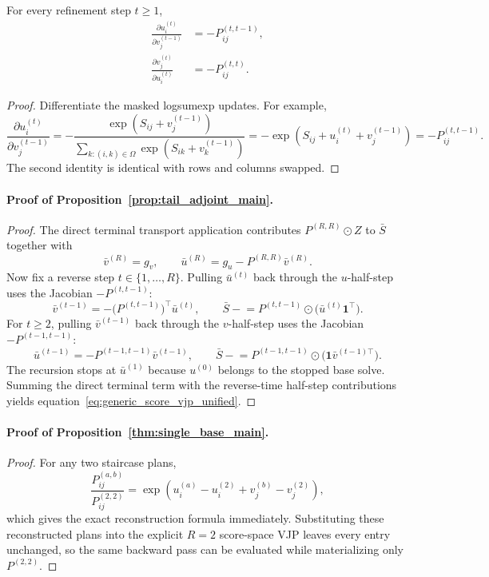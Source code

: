 \begin{lemma}
For every refinement step $t\ge 1$,
\begin{align}
    \frac{\partial u_i^{(t)}}{\partial v_j^{(t-1)}} &= -P_{ij}^{(t,t-1)}, \\
    \frac{\partial v_j^{(t)}}{\partial u_i^{(t)}} &= -P_{ij}^{(t,t)}.
\end{align}
\end{lemma}

\begin{proof}
Differentiate the masked logsumexp updates. For example,
\[
\frac{\partial u_i^{(t)}}{\partial v_j^{(t-1)}}
=
-
\frac{\exp(S_{ij}+v_j^{(t-1)})}{\sum_{k:(i,k)\in\Omega}\exp(S_{ik}+v_k^{(t-1)})}
=
-\exp(S_{ij}+u_i^{(t)}+v_j^{(t-1)})
=
-P_{ij}^{(t,t-1)}.
\]
The second identity is identical with rows and columns swapped.
\end{proof}

\paragraph{Proof of Proposition~\ref{prop:tail_adjoint_main}.}
\begin{proof}
The direct terminal transport application contributes $P^{(R,R)}\odot Z$ to $\bar S$ together with
\[
\bar v^{(R)}=g_v,
\qquad
\bar u^{(R)}=g_u-P^{(R,R)}\bar v^{(R)}.
\]
Now fix a reverse step $t\in\{1,\dots,R\}$. Pulling $\bar u^{(t)}$ back through the $u$-half-step uses the Jacobian $-P^{(t,t-1)}$:
\[
\bar v^{(t-1)} = -\bigl(P^{(t,t-1)}\bigr)^\top \bar u^{(t)},
\qquad
\bar S \mathrel{-}= P^{(t,t-1)}\odot\bigl(\bar u^{(t)}\mathbf{1}^\top\bigr).
\]
For $t\ge 2$, pulling $\bar v^{(t-1)}$ back through the $v$-half-step uses the Jacobian $-P^{(t-1,t-1)}$:
\[
\bar u^{(t-1)} = -P^{(t-1,t-1)}\bar v^{(t-1)},
\qquad
\bar S \mathrel{-}= P^{(t-1,t-1)}\odot\bigl(\mathbf{1}\bar v^{(t-1)\top}\bigr).
\]
The recursion stops at $\bar u^{(1)}$ because $u^{(0)}$ belongs to the stopped base solve. Summing the direct terminal term with the reverse-time half-step contributions yields equation~\eqref{eq:generic_score_vjp_unified}.
\end{proof}

\paragraph{Proof of Proposition~\ref{thm:single_base_main}.}
\begin{proof}
For any two staircase plans,
\[
\frac{P_{ij}^{(a,b)}}{P_{ij}^{(2,2)}}
=
\exp(u_i^{(a)}-u_i^{(2)}+v_j^{(b)}-v_j^{(2)}),
\]
which gives the exact reconstruction formula immediately. Substituting these reconstructed plans into the explicit $R=2$ score-space VJP leaves every entry unchanged, so the same backward pass can be evaluated while materializing only $P^{(2,2)}$.
\end{proof}

